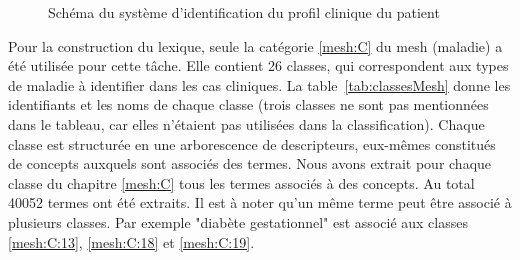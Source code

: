 \begin{figure}[htb]
    \small
    \centering
    \caption{Schéma du système d'identification du profil clinique du patient}
    \label{fig:class:sys-sch}
\end{figure}

Pour la construction du lexique, seule la catégorie \ref{mesh:C} du \gls{mesh} (maladie) a été utilisée pour cette tâche.
Elle contient \num{26} classes, qui correspondent aux types de maladie à identifier dans les cas cliniques.
La table~\ref{tab:classesMesh} donne les identifiants et les noms de chaque classe (trois classes ne sont pas mentionnées dans le tableau, car elles n'étaient pas utilisées dans la classification).
Chaque classe est structurée en une arborescence de descripteurs, eux-mêmes constitués de concepts auxquels sont associés des termes.
Nous avons extrait pour chaque classe du chapitre \ref{mesh:C} tous les termes associés à des concepts.
Au total \num{40052} termes ont été extraits.
Il est à noter qu'un même terme peut être associé à plusieurs classes.
Par exemple "diabète gestationnel" est associé aux classes \ref{mesh:C:13}, \ref{mesh:C:18} et \ref{mesh:C:19}.

